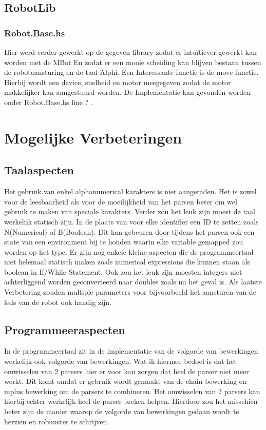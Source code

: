 \documentclass[a4paper,10pt]{article}
\begin{document}
  \subsection{RobotLib}
    \subsubsection{Robot.Base.hs}
    Hier werd verder gewerkt op de gegeven library zodat er intuïtiever gewerkt kan worden met de MBot
    En zodat er een mooie scheiding kan blijven bestaan tussen de robotaansturing en de taal Alphi.
    Een Interessante functie is de move functie. Hierbij wordt een device, snelheid en motor meegegeven
    zodat de motor makkelijker kan aangestuurd worden.
    De Implementatie kan gevonden worden onder Robot.Base.hs line ? .

\section{Mogelijke Verbeteringen}
  \subsection{Taalaspecten} 
    Het gebruik van enkel alphanumerical karakters is niet aangeraden.
  Het is zowel voor de leesbaarheid als voor de moeilijkheid van het parsen beter om wel gebruik te maken van speciale karakters.
  Verder zou het leuk zijn moest de taal werkelijk statisch zijn. In de plaats van voor elke identifier een ID te zetten zoals N(Numerical) of B(Boolean).
  Dit kan gebeuren door tijdens het parsen ook een state van een environment bij te houden waarin elke variable gemapped zou worden op het type.
  Er zijn nog enkele kleine aspecten die de programmeertaal niet helemaal statisch maken zoals numerical expressions die kunnen staan als boolean in If/While Statement.
  Ook zou het leuk zijn moesten integers niet achterliggend worden geconverteerd naar doubles zoals nu het geval is.
  Als laatste Verbetering zouden multiple parameters voor bijvoorbeeld het aansturen van de leds van de robot ook handig zijn.

  \subsection{Programmeeraspecten} 
  In de programmeertaal zit in de implementatie van de volgorde van bewerkingen werkelijk ook volgorde van bewerkingen.
  Wat ik hiermee bedoel is dat het omwisselen van 2 parsers hier er voor kan zorgen dat heel de parser niet meer werkt.
  Dit komt omdat er gebruik wordt gemaakt van de chain bewerking en mplus bewerking om de parsers te combineren. Het omwisselen van 2  parsers kan hierbij echter werkelijk heel de parser breken helpen. Hierdoor zou het misschien beter zijn de manier waarop de volgorde van bewerkingen gedaan wordt te herzien en robuuster te schrijven.
\end{document}
